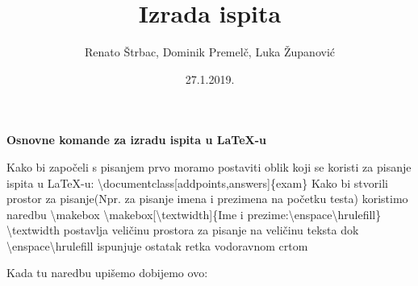 \documentclass[addpoints,answers]{beamer}
\newcounter{points}
\begin{document}
	\title{Izrada ispita}
	\date{27.1.2019.}
	\author{Renato Štrbac, Dominik Premelč, Luka Županović}
	
	
	\maketitle
	\tableofcontents
	
	\begin{frame}
	\begin{center}
		\textbf{Osnovne komande za izradu ispita u LaTeX-u}
	\end{center}
\end{frame}

\begin{frame}
Kako bi započeli s pisanjem prvo moramo postaviti oblik koji se koristi za pisanje ispita u LaTeX-u:
\newline
\newline
\color{blue}
\textbackslash{documentclass[addpoints,answers]\{exam\}}
\color{black}
\newline
\newline
Kako bi stvorili prostor za pisanje(Npr. za pisanje imena i prezimena na početku testa) koristimo naredbu \textbackslash{makebox}
\newline
\newline
\color{blue}
\textbackslash{makebox[\textbackslash{textwidth}]}\{Ime i prezime:\textbackslash{enspace\textbackslash{hrulefill}}\}
\color{black}
\newline
\newline
\textbackslash{textwidth} postavlja veličinu prostora za pisanje na veličinu teksta dok \textbackslash{enspace\textbackslash{hrulefill}} ispunjuje ostatak retka vodoravnom crtom
\end{frame}

\begin{frame}
Kada tu naredbu upišemo dobijemo ovo:
\newline
\newline
{}
\end{frame}
\end{document}
